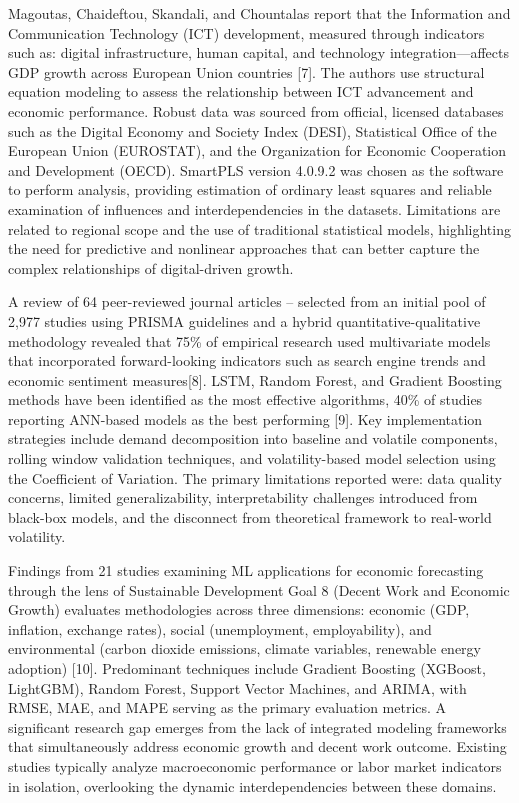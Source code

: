 \documentclass[12pt]{article}
\begin{document}
        Magoutas, Chaideftou, Skandali, and Chountalas report that the Information and Communication Technology (ICT) development, measured through indicators such as: digital infrastructure, human capital, and technology integration—affects GDP growth across European Union countries [7]. The authors use structural equation modeling to assess the relationship between ICT advancement and economic performance. Robust data was sourced from official, licensed databases such as the Digital Economy and Society Index (DESI), Statistical Office of the European Union (EUROSTAT), and the Organization for Economic Cooperation and Development (OECD). SmartPLS version 4.0.9.2 was chosen as the software to perform analysis, providing estimation of ordinary least squares and reliable examination of influences and interdependencies in the datasets. Limitations are related to regional scope and the use of traditional statistical models, highlighting the need for predictive and nonlinear approaches that can better capture the complex relationships of digital-driven growth.
        
        A review of 64 peer-reviewed journal articles -- selected from an initial pool of 2,977 studies using PRISMA guidelines and a hybrid quantitative-qualitative methodology revealed that 75\% of empirical research used multivariate models that incorporated forward-looking indicators such as search engine trends and economic sentiment measures[8]. LSTM, Random Forest, and Gradient Boosting methods have been identified as the most effective algorithms, 40\% of studies reporting ANN-based models as the best performing [9]. Key implementation strategies include demand decomposition into baseline and volatile components, rolling window validation techniques, and volatility-based model selection using the Coefficient of Variation. The primary limitations reported were: data quality concerns, limited generalizability, interpretability challenges introduced from black-box models, and the disconnect from theoretical framework to real-world volatility.

        Findings from 21 studies examining ML applications for economic forecasting through the lens of Sustainable Development Goal 8 (Decent Work and Economic Growth) evaluates methodologies across three dimensions:  economic (GDP, inflation, exchange rates), social (unemployment, employability), and environmental (carbon dioxide emissions, climate variables, renewable energy adoption) [10]. Predominant techniques include Gradient Boosting (XGBoost, LightGBM), Random Forest, Support Vector Machines, and ARIMA, with RMSE, MAE, and MAPE serving as the primary evaluation metrics. A significant research gap emerges from the lack of integrated modeling frameworks that simultaneously address economic growth and decent work outcome. Existing studies typically analyze macroeconomic performance or labor market indicators in isolation, overlooking the dynamic interdependencies between these domains.
        
\end{document}
